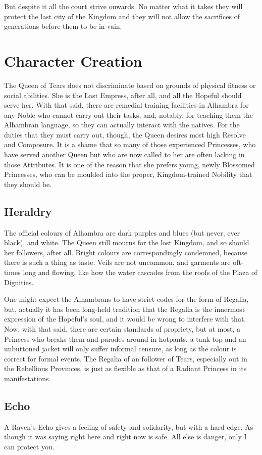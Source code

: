 But despite it all the court strive onwards. No matter what it takes they will protect the last city of the Kingdom and they will not allow the sacrifices of generations before them to be in vain. 

\section*{Character Creation}
The Queen of Tears does not discriminate based on grounds of physical fitness or social abilities. She is the Last Empress, after all, and all the Hopeful should serve her. With that said, there are remedial training facilities in Alhambra for any Noble who cannot carry out their tasks, and, notably, for teaching them the Alhambran language, so they can actually interact with the natives. For the duties that they must carry out, though, the Queen desires most high Resolve and Composure. It is a shame that so many of those experienced Princesses, who have served another Queen but who are now called to her are often lacking in those Attributes. It is one of the reason that she prefers young, newly Blossomed Princesses, who can be moulded into the proper, Kingdom-trained Nobility that they should be.
\subsection*{Heraldry}
The official colours of Alhambra are dark purples and blues (but never, ever black), and white. The Queen still mourns for the lost Kingdom, and so should her followers, after all. Bright colours are correspondingly condemned, because there is such a thing as taste. Veils are not uncommon, and garments are oft-times long and flowing, like how the water cascades from the roofs of the Plaza of Dignities.

One might expect the Alhambrans to have strict codes for the form of Regalia, but, actually it has been long-held tradition that the Regalia is the innermost expression of the Hopeful's soul, and it would be wrong to interfere with that. Now, with that said, there are certain standards of propriety, but at most, a Princess who breaks them and parades around in hotpants, a tank top and an unbuttoned jacket will only suffer informal censure, as long as the colour is correct for formal events. The Regalia of an follower of Tears, especially out in the Rebellious Provinces, is just as flexible as that of a Radiant Princess in its manifestations. 

\subsection*{Echo}
A Raven's Echo gives a feeling of safety and solidarity, but with a hard edge. As though it was saying right here and right now is safe. All else is danger, only I can protect you. 
